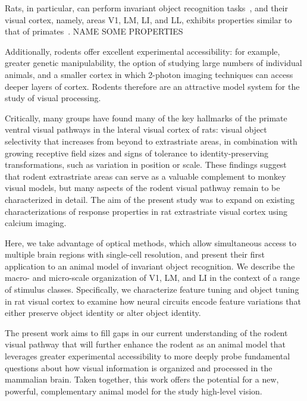 Rats, in particular, can perform invariant object recognition tasks~\cite{Zoccolan2009, Tafazoli2012Transformation-TolerantPriming, cite}, and their visual cortex, namely, areas V1, LM, LI, and LL, exhibits properties similar to that of primates~\cite{Tafazoli2017, Vermaercke2014, Matteucci2019b, cite}. {NAME SOME PROPERTIES}

Additionally, rodents offer excellent experimental accessibility: for example, greater genetic manipulability, the option of studying large numbers of individual animals, and a smaller cortex in which 2-photon imaging techniques can access deeper layers of cortex. Rodents therefore are an attractive model system for the study of visual processing.

Critically, many groups \cite{EVERYONE} have found many of the key hallmarks of the primate ventral visual pathways in the lateral visual cortex of rats: visual object selectivity that increases from beyond to extrastriate areas, in combination with growing receptive field sizes and signs of tolerance to identity-preserving transformations, such as variation in position or scale. These findings suggest that rodent extrastriate areas can serve as a valuable complement to monkey visual models, but many aspects of the rodent visual pathway remain to be characterized in detail. The aim of the present study was to expand on existing characterizations of response properties in rat extrastriate visual cortex using calcium imaging.


Here, we take advantage of optical methods, which allow simultaneous access to multiple brain regions with single-cell resolution, and present their first application to an animal model of invariant object recognition. We describe the macro- and micro-scale organization of V1, LM, and LI in the context of a range of stimulus classes. Specifically, we characterize feature tuning and object tuning in rat visual cortex to examine how neural circuits encode feature variations that either preserve object identity or alter object identity. 


The present work aims to fill gaps in our current understanding of the rodent visual pathway that will further enhance the rodent as an animal model that leverages greater experimental accessibility to more deeply probe fundamental questions about how visual information is organized and processed in the mammalian brain. Taken together, this work offers the potential for a new, powerful, complementary animal model for the study high-level vision.


